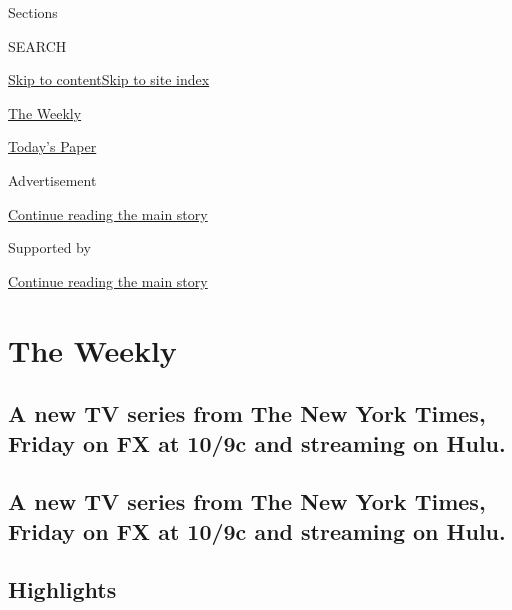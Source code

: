 Sections

SEARCH

\protect\hyperlink{site-content}{Skip to
content}\protect\hyperlink{site-index}{Skip to site index}

\href{https://www.nytimes3xbfgragh.onion/section/the-weekly}{The Weekly}

\href{https://myaccount.nytimes3xbfgragh.onion/auth/login?response_type=cookie\&client_id=vi}{}

\href{https://www.nytimes3xbfgragh.onion/section/todayspaper}{Today's
Paper}

Advertisement

\protect\hyperlink{after-top}{Continue reading the main story}

Supported by

\protect\hyperlink{after-sponsor}{Continue reading the main story}

\hypertarget{the-weekly}{%
\section{The Weekly}\label{the-weekly}}

\hypertarget{a-new-tv-series-from-the-new-york-times-friday-on-fx-at-109c-and-streaming-on-hulu}{%
\subsection{A new TV series from The New York Times, Friday on FX at
10/9c and streaming on
Hulu.}\label{a-new-tv-series-from-the-new-york-times-friday-on-fx-at-109c-and-streaming-on-hulu}}

\hypertarget{a-new-tv-series-from-the-new-york-times-friday-on-fx-at-109c-and-streaming-on-hulu-1}{%
\subsection{A new TV series from The New York Times, Friday on FX at
10/9c and streaming on
Hulu.}\label{a-new-tv-series-from-the-new-york-times-friday-on-fx-at-109c-and-streaming-on-hulu-1}}

\hypertarget{highlights}{%
\subsection{Highlights}\label{highlights}}

